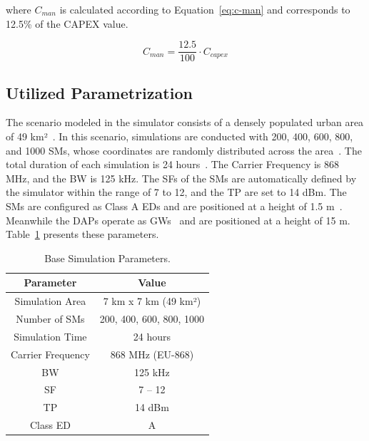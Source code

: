 \documentclass[a4paper,fleqn]{cas-dc}
\begin{document}
\noindent where \( C_{man} \) is calculated according to Equation~\ref{eq:c-man} and corresponds to 12.5\% of the \gls{CAPEX} value.

\begin{equation} \label{eq:c-man}
    C_{man} = \frac{12.5}{100} \cdot C_{capex}
\end{equation}

\subsection{Utilized Parametrization} \label{sec:parameters}


The scenario modeled in the simulator consists of a densely populated urban area of 49 km²~\cite{wei2023priority}. In this scenario, simulations are conducted with 200, 400, 600, 800, and 1000 \gls{SMs}, whose coordinates are randomly distributed across the area~\cite{almuhaya2022survey}. The total duration of each simulation is 24 hours~\cite{farhad2020enhanced}. The Carrier Frequency is 868 MHz, and the \gls{BW} is 125 kHz. The \gls{SF}s of the SMs are automatically defined by the simulator within the range of 7 to 12, and the \gls{TP} are set to 14 dBm. The \gls{SMs} are configured as Class A \gls{EDs} and are positioned at a height of 1.5 m~\cite{gallardo2021lora}. Meanwhile the \gls{DAPs} operate as \gls{GWs}~\cite{gallardo2021lora} and are positioned at a height of 15 m. Table~\ref{tab:base_params} presents these parameters.

\begin{table}[ht]
    \centering
    \caption{Base Simulation Parameters.}
    \begin{tabular}{cc}
        \hline \hline 
        Parameter & Value \\ \hline
        Simulation Area & 7 km x 7 km (49 km²)\\
        Number of \gls{SMs} & 200, 400, 600, 800, 1000\\
        Simulation Time & 24 hours\\
        Carrier Frequency & 868 MHz (EU-868)\\ 
        \gls{BW} & 125 kHz\\ 
        \gls{SF} & 7 -- 12\\ 
        \gls{TP} & 14 dBm \\ 
        Class ED & A \\ \hline \hline
    \end{tabular}
    \label{tab:base_params}
\end{table}
\end{document}
